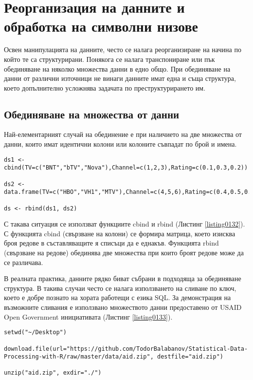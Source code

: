﻿\newpage
\chapter{Реорганизация на данните и обработка на символни низове}
\label{chapter07}

Освен манипулацията на данните, често се налага реорганизиране на начина по който те са структурирани. Понякога се налага транспониране или пък обединяване на няколко множества данни в едно общо. При обединяване на данни от различни източници не винаги данните имат една и съща структура, което допълнително усложнява задачата по преструктурирането им. 

\section{Обединяване на множества от данни}

Най-елементарният случай на обединение е при наличието на две множества от данни, които имат идентични колони или колоните съвпадат по брой и имена.

\begin{lstlisting}[caption=Обединяване на множества от данни, label=listing0132]
ds1 <- cbind(TV=c("BNT","bTV","Nova"),Channel=c(1,2,3),Rating=c(0.1,0.3,0.2))

ds2 <- data.frame(TV=c("HBO","VH1","MTV"),Channel=c(4,5,6),Rating=c(0.4,0.5,0.6),stringsAsFactors=FALSE)

ds <- rbind(ds1, ds2)
\end{lstlisting}

С такава ситуация се използват функциите cbind и rbind (Листинг \ref{listing0132}). С функцията cbind (свързване на колони) се формира матрица, което изисква броя редове в съставляващите я списъци да е еднакъв. Функцията rbind (свързване на редове) обединява две множества при които броят редове може да се различава. 

В реалната практика, данните рядко биват събрани в подходяща за обединяване структура. В такива случаи често се налага използването на сливане по ключ, което е добре познато на хората работещи с езика SQL. За демонстрация на възможните сливания е използвано множеството данни предоставено от USAID Open Government инициативата (Листинг \ref{listing0133}). 

\begin{lstlisting}[caption=USAID множество от данни, label=listing0133]
setwd("~/Desktop")

download.file(url="https://github.com/TodorBalabanov/Statistical-Data-Processing-with-R/raw/master/data/aid.zip", destfile="aid.zip")

unzip("aid.zip", exdir="./")
\end{lstlisting}

